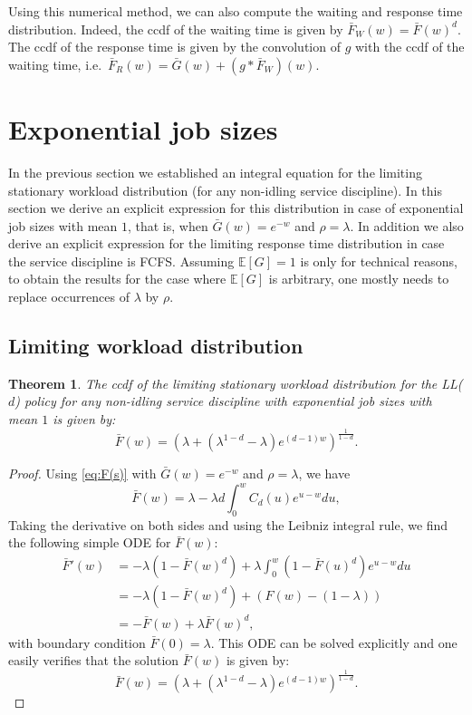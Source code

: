 \documentclass[12pt]{report}
\newcommand{\E}{\mathbb{E}}
\newtheorem{theorem}{Theorem}
\begin{document}
Using this numerical method, we can also compute the waiting and response time distribution. Indeed, the ccdf of the waiting time is given by $\bar F_W(w)=\bar F(w)^d$. The ccdf of the response time is given by the convolution of $g$ with the ccdf of the waiting time, i.e.~$\bar F_R(w) = \bar G(w) + (g * \bar F_W)(w)$.


\section{Exponential job sizes}\label{sec:expo}
In the previous section we established an integral equation for the limiting stationary workload
distribution (for any non-idling service discipline). In this section we derive an explicit
expression for this distribution in case of exponential job sizes with mean $1$, that is, when $\bar G(w) =  e^{-w}$
and $\rho = \lambda$.
In addition we also derive an explicit expression for the limiting response time distribution in case
the service discipline is FCFS. Assuming $\E[G]=1$ is only for technical reasons, to obtain the results for the case where $\E[G]$ is arbitrary, one mostly needs to replace occurrences of $\lambda$ by $\rho$.

\subsection{Limiting workload distribution}
\begin{theorem} \label{thm:LLd_exp}
The ccdf of the limiting stationary workload distribution for the LL($d$) policy for any non-idling 
service discipline with exponential job sizes with mean $1$ is given by:
\begin{equation}\label{eq:expExact}
\bar{F}(w) = (\lambda + (\lambda ^{1-d} - \lambda) e^{(d-1)w})^{\frac{1}{1-d}}.
\end{equation}
\end{theorem}
\begin{proof}
Using \eqref{eq:F(s)} with $\bar G(w) = e^{-w}$
and $\rho = \lambda$, we have
\begin{equation}\label{eq:F(s)exponential}
\bar F(w) = \lambda - \lambda d \int_{0}^w C_d(u) e^{u-w} du,
\end{equation}
Taking the derivative on both sides and using the Leibniz integral rule, we find the following simple ODE for $\bar F(w)$:
\begin{align}\label{eq:ODEexp}
\bar F'(w) &= -\lambda (1-\bar{F}(w)^d) +\lambda \int_{0}^w (1-\bar{F}(u)^d)e^{u-w}du \nonumber\\
&= -\lambda (1-\bar{F}(w)^d) + (F(w)-(1-\lambda)) \nonumber \\
&= - \bar{F}(w) + \lambda \bar{F}(w)^d,
\end{align}
with boundary condition $\bar F(0) = \lambda$. This ODE can be solved explicitly and one easily verifies that the solution $\bar{F}(w)$ is given by:
$$
\bar{F}(w) = (\lambda + (\lambda ^{1-d} - \lambda) e^{(d-1)w})^{\frac{1}{1-d}}.
$$
\end{proof}
\end{document}
